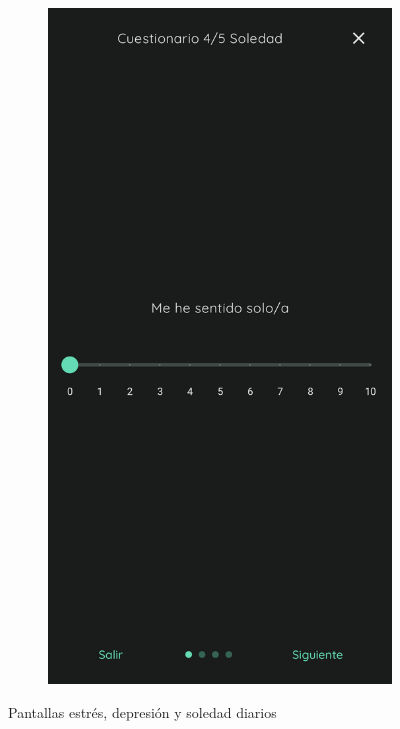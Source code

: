 \begin{figure}[htbp]
\begin{subfigure}[c]{0.29\textwidth}
                		\includegraphics[width=1\linewidth]{figures/pantallas/Soledad diario.png}
                	\end{subfigure}
                	\caption{Pantallas estrés, depresión y soledad diarios}
                	\label{figure:implementacion:pantalla:estres_depresion_soledad_diarios}
                \end{figure}

